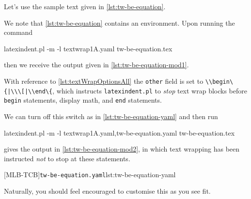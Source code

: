  \begin{example}
 Let's use the sample text given in \cref{lst:tw-be-equation}.  


 We note that \cref{lst:tw-be-equation} contains an environment. Upon running the command

 \begin{commandshell}
latexindent.pl -m -l textwrap1A.yaml tw-be-equation.tex
\end{commandshell}

 then we receive the output given in \cref{lst:tw-be-equation-mod1}.


 With reference to \vref{lst:textWrapOptionsAll} the \texttt{other} field is set to
 \lstinline!\\begin\{|\\\[|\\end\{!, which instructs \texttt{latexindent.pl} to
 \emph{stop} text wrap blocks before \texttt{begin} statements, display math, and
 \texttt{end} statements.

 We can turn off this switch as in \cref{lst:tw-be-equation-yaml} and then run
 \begin{widepage}

  \begin{commandshell}
latexindent.pl -m -l textwrap1A.yaml,tw-be-equation.yaml tw-be-equation.tex
\end{commandshell}

 \end{widepage}
 gives the output in \cref{lst:tw-be-equation-mod2}, in which text wrapping has been
 instructed \emph{not} to stop at these statements.

 [MLB-TCB]{\texttt{tw-be-equation.yaml}}{lst:tw-be-equation-yaml}

 \begin{widepage}
 \end{widepage}

 Naturally, you should feel encouraged to customise this as you see fit.
 \end{example}

